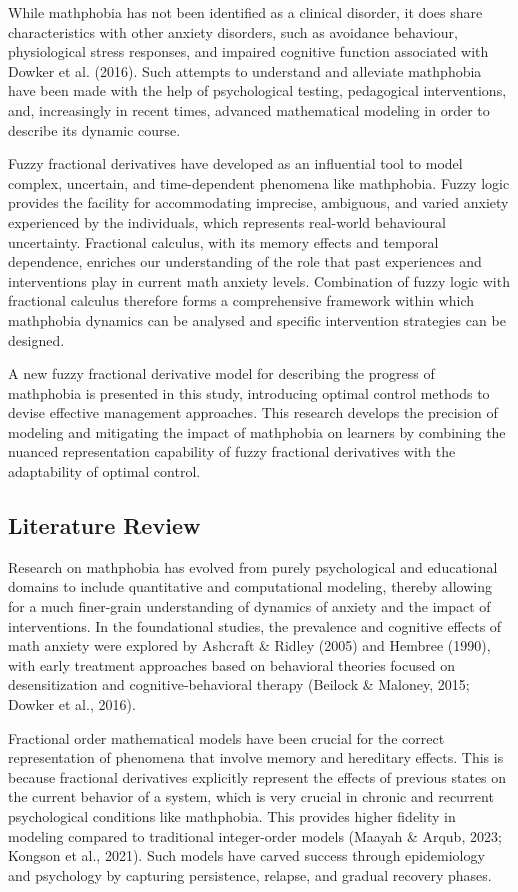 \documentclass[10pt]{NSP1}
\begin{document}
While mathphobia has not been identified as a clinical disorder, it does share characteristics with other anxiety disorders, such as avoidance behaviour, physiological stress responses, and impaired cognitive function associated with Dowker et al. (2016). Such attempts to understand and alleviate mathphobia have been made with the help of psychological testing, pedagogical interventions, and, increasingly in recent times, advanced mathematical modeling in order to describe its dynamic course.

Fuzzy fractional derivatives have developed as an influential tool to model complex, uncertain, and time-dependent phenomena like mathphobia. Fuzzy logic provides the facility for accommodating imprecise, ambiguous, and varied anxiety experienced by the individuals, which represents real-world behavioural uncertainty. Fractional calculus, with its memory effects and temporal dependence, enriches our understanding of the role that past experiences and interventions play in current math anxiety levels. Combination of fuzzy logic with fractional calculus therefore forms a comprehensive framework within which mathphobia dynamics can be analysed and specific intervention strategies can be designed.

A new fuzzy fractional derivative model for describing the progress of mathphobia is presented in this study, introducing optimal control methods to devise effective management approaches. This research develops the precision of modeling and mitigating the impact of mathphobia on learners by combining the nuanced representation capability of fuzzy fractional derivatives with the adaptability of optimal control.

\subsection*{Literature Review}

Research on mathphobia has evolved from purely psychological and educational domains to include quantitative and computational modeling, thereby allowing for a much finer-grain understanding of dynamics of anxiety and the impact of interventions. In the foundational studies, the prevalence and cognitive effects of math anxiety were explored by Ashcraft \& Ridley (2005) and Hembree (1990), with early treatment approaches based on behavioral theories focused on desensitization and cognitive-behavioral therapy (Beilock \& Maloney, 2015; Dowker et al., 2016).

Fractional order mathematical models have been crucial for the correct representation of phenomena that involve memory and hereditary effects. This is because fractional derivatives explicitly represent the effects of previous states on the current behavior of a system, which is very crucial in chronic and recurrent psychological conditions like mathphobia. This provides higher fidelity in modeling compared to traditional integer-order models (Maayah \& Arqub, 2023; Kongson et al., 2021). Such models have carved success through epidemiology and psychology by capturing persistence, relapse, and gradual recovery phases.
\end{document}
